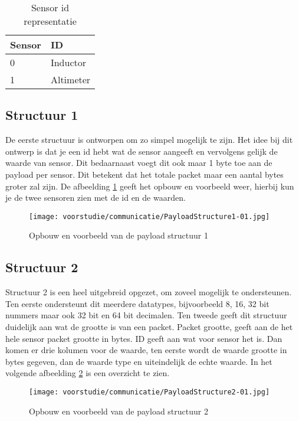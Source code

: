 \begin{table}[h!]
	\centering
	\caption{Sensor id representatie}
	\label{tab:SensorRep}
	\begin{tabular}{p{2cm}p{6cm}}
	\toprule
	Sensor & ID        \\ \midrule
	0      & Inductor  \\
	1      & Altimeter \\ \bottomrule
	\end{tabular}%
\end{table}

\subsection{Structuur 1}
De eerste structuur is ontworpen om zo simpel mogelijk te zijn. Het idee bij dit ontwerp is dat je een id hebt wat de sensor aangeeft en vervolgens gelijk de waarde van sensor. Dit bedaarnaast voegt dit ook maar 1 byte toe aan de payload per sensor. Dit betekent dat het totale packet maar een aantal bytes groter zal zijn. De afbeelding \ref{fig:Structure1} geeft het opbouw en voorbeeld weer, hierbij kun je de twee sensoren zien met de id en de waarden.
\begin{figure}[h!]
	\centering
	\label{fig:Structure1}

	\caption{Opbouw en voorbeeld van de payload structuur 1}
	\texttt{[image: voorstudie/communicatie/PayloadStructure1-01.jpg]}
\end{figure}

\newpage
\subsection{Structuur 2}
Structuur 2 is een heel uitgebreid opgezet, om zoveel mogelijk te ondersteunen. Ten eerste ondersteunt dit meerdere datatypes, bijvoorbeeld 8, 16, 32 bit nummers maar ook 32 bit en 64 bit decimalen. Ten tweede geeft dit structuur duidelijk aan wat de grootte is van een packet. Packet grootte, geeft aan de het hele sensor packet grootte in bytes. ID geeft aan wat voor sensor het is. Dan komen er drie kolumen voor de waarde, ten eerste wordt de waarde grootte in bytes gegeven, dan de waarde type en uiteindelijk de echte waarde. In het volgende afbeelding \ref{fig:Structure2} is een overzicht te zien.
\begin{figure}[h!]
	\centering
	\label{fig:Structure2}
	\caption{Opbouw en voorbeeld van de payload structuur 2}
	\texttt{[image: voorstudie/communicatie/PayloadStructure2-01.jpg]}
\end{figure}

